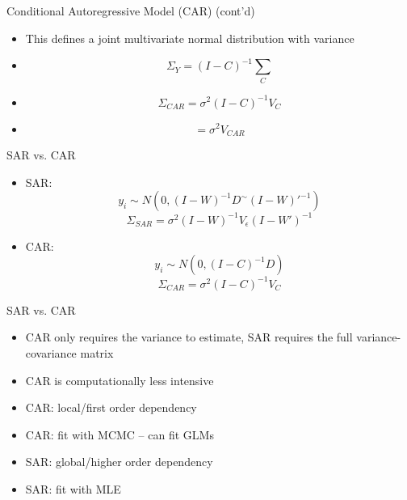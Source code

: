 \documentclass[aspectratio = 169, 12pt]{beamer}\usepackage[]{graphicx}\usepackage[]{color}
\begin{document}
\begin{frame}{Conditional Autoregressive Model (CAR) (cont'd)}
\begin{itemize}
\item This defines a joint multivariate normal distribution with variance
\item $$ \Sigma_Y = (I - C)^{-1} \sum_{C} $$
\item $$ \Sigma_{CAR} = \sigma^{2} (I - C)^{-1} V_{C} $$
\item $$ = \sigma^{2}V_{CAR} $$
\end{itemize}
\end{frame}


\begin{frame}{SAR vs. CAR}
\begin{itemize}
\item SAR: $$ y_i \sim N(0, (I-W)^{-1} D^{\sim} (I-W)'^{-1}) $$
 $$ \Sigma_{SAR} = \sigma^{2} (I - W)^{-1} V_{\epsilon} (I - W')^{-1} $$
\item CAR: $$ y_i \sim N(0, (I-C)^{-1} D )$$
 $$ \Sigma_{CAR} = \sigma^{2} (I - C)^{-1} V_{C} $$
\end{itemize}
\end{frame}


\begin{frame}{SAR vs. CAR}
\begin{itemize}
\item CAR only requires the variance to estimate, SAR requires the full variance-covariance matrix
\item CAR is computationally less intensive
\item CAR: local/first order dependency
\item CAR: fit with MCMC -- can fit GLMs
\item SAR: global/higher order dependency
\item SAR: fit with MLE
\end{itemize}
\end{frame}
\end{document}
